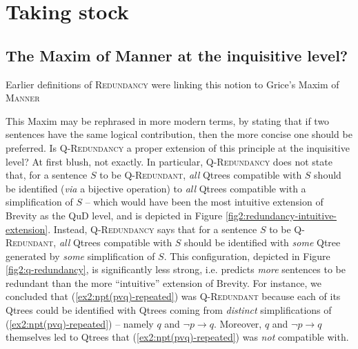 \section{Taking stock}

\subsection{The Maxim of Manner at the inquisitive level?}
Earlier definitions of \textsc{Redundancy} were linking this notion to Grice's Maxim of \textsc{Manner}
\begin{exe}
\end{exe}
This Maxim may be rephrased in more modern terms, by stating that if two sentences have the same logical contribution, then the more concise one should be preferred. Is \textsc{Q-Redundancy} a proper extension of this principle at the inquisitive level? At first blush, not exactly. In particular, \textsc{Q-Redundancy} does not state that, for a sentence $S$ to be \textsc{Q-Redundant}, \textit{all} Qtrees compatible with $S$ should be identified (\textit{via} a bijective operation) to \textit{all} Qtrees compatible with a simplification of $S$ -- which would have been the most intuitive extension of Brevity as the QuD level, and is depicted in Figure \ref{fig2:redundancy-intuitive-extension}. Instead, \textsc{Q-Redundancy} says that for a sentence $S$ to be \textsc{Q-Redundant}, \textit{all} Qtrees compatible with $S$ should be identified with \textit{some} Qtree generated by \textit{some} simplification of $S$. This configuration, depicted in Figure \ref{fig2:q-redundancy}, is significantly less strong, i.e. predicts \textit{more} sentences to be redundant than the more ``intuitive'' extension of Brevity. For instance, we concluded that (\ref{ex2:npt(pvq)-repeated}) was \textsc{Q-Redundant} because each of its Qtrees could be identified with Qtrees coming from \textit{distinct} simplifications of (\ref{ex2:npt(pvq)-repeated}) -- namely $q$ and $\neg p \rightarrow q$. Moreover, $q$ and $\neg p \rightarrow q$ themselves led to Qtrees that (\ref{ex2:npt(pvq)-repeated}) was \textit{not} compatible with.

